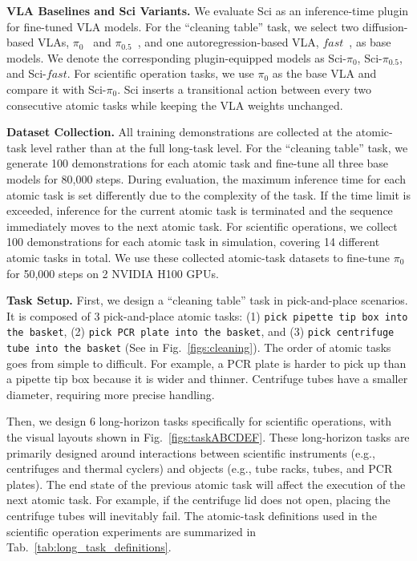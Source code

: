 \documentclass[letterpaper]{article} %
\begin{document}
\textbf{VLA Baselines and Sci Variants.}
We evaluate Sci as an inference-time plugin for fine-tuned VLA models. For the ``cleaning table'' task, we select two diffusion-based VLAs, $\pi_0$~\cite{black2024pi_0} and $\pi_{0.5}$~\cite{black2025pi_}, and one autoregression-based VLA, $fast$~\cite{pertsch2025fast}, as base models. We denote the corresponding plugin-equipped models as Sci-$\pi_0$, Sci-$\pi_{0.5}$, and Sci-$fast$. For scientific operation tasks, we use $\pi_0$ as the base VLA and compare it with Sci-$\pi_0$. Sci inserts a transitional action between every two consecutive atomic tasks while keeping the VLA weights unchanged.

\textbf{Dataset Collection.}
All training demonstrations are collected at the atomic-task level rather than at the full long-task level. For the ``cleaning table'' task, we generate 100 demonstrations for each atomic task and fine-tune all three base models for 80,000 steps. During evaluation, the maximum inference time for each atomic task is set differently due to the complexity of the task. If the time limit is exceeded, inference for the current atomic task is terminated and the sequence immediately moves to the next atomic task. For scientific operations, we collect 100 demonstrations for each atomic task in simulation, covering 14 different atomic tasks in total. We use these collected atomic-task datasets to fine-tune $\pi_0$ for 50,000 steps on 2 NVIDIA H100 GPUs.

\textbf{Task Setup.}
First, we design a ``cleaning table'' task in pick-and-place scenarios. It is composed of 3 pick-and-place atomic tasks:
(1) \texttt{pick pipette tip box into the basket},
(2) \texttt{pick PCR plate into the basket}, and
(3) \texttt{pick centrifuge tube into the basket} (See in Fig.~\ref{figs:cleaning}).
The order of atomic tasks goes from simple to difficult.
For example, a PCR plate is harder to pick up than a pipette tip box because it is wider and thinner. Centrifuge tubes have a smaller diameter, requiring more precise handling.

Then, we design 6 long-horizon tasks specifically for scientific operations, with the visual layouts shown in Fig.~\ref{figs:taskABCDEF}. These long-horizon tasks are primarily designed around interactions between scientific instruments (e.g., centrifuges and thermal cyclers) and objects (e.g., tube racks, tubes, and PCR plates). The end state of the previous atomic task will affect the execution of the next atomic task. For example, if the centrifuge lid does not open, placing the centrifuge tubes will inevitably fail.
The atomic-task definitions used in the scientific operation experiments are summarized in Tab.~\ref{tab:long_task_definitions}.
\end{document}
